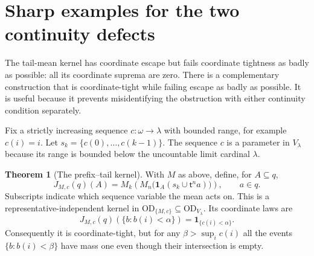 \documentclass[11pt,letterpaper]{article}
\theoremstyle{definition}
\newtheorem{theorem}[definition]{Theorem}
\newcommand{\OD}{\mathrm{OD}}
\newcommand{\ODlam}{\OD_{V_\lambda}}
\newcommand{\ind}{\mathbf 1}
\newcommand{\tail}{\mathsf t}
\begin{document}
\section{Sharp examples for the two continuity defects}\label{sec:prefix}

The tail-mean kernel has coordinate escape but fails coordinate tightness as badly as possible: all its coordinate suprema are zero. There is a complementary construction that is coordinate-tight while failing escape as badly as possible. It is useful because it prevents misidentifying the obstruction with either continuity condition separately.

Fix a strictly increasing sequence $c:\omega\to\lambda$ with bounded range, for example $c(i)=i$. Let $s_k=\{c(0),\ldots,c(k-1)\}$. The sequence $c$ is a parameter in $V_\lambda$ because its range is bounded below the uncountable limit cardinal $\lambda$.

\begin{theorem}[The prefix--tail kernel]\label{thm:prefix}
With $M$ as above, define, for $A\subseteq q$,
\begin{equation}\label{eq:prefix}
 J_{M,c}(q)(A)
 =M_k\left(M_n\bigl(\ind_A(s_k\cup\tail^n a)\bigr)\right),
 \qquad a\in q.
\end{equation}
Subscripts indicate which sequence variable the mean acts on. This is a representative-independent kernel in $\OD_{\{M,c\}}\subseteq\ODlam$. Its coordinate laws are
\begin{equation}\label{eq:prefixcdf}
 J_{M,c}(q)(\{b:b(i)<\alpha\})=\ind_{\{c(i)<\alpha\}}.
\end{equation}
Consequently it is coordinate-tight, but for any $\beta>\sup_i c(i)$ all the events $\{b:b(i)<\beta\}$ have mass one even though their intersection is empty.
\end{theorem}
\end{document}
